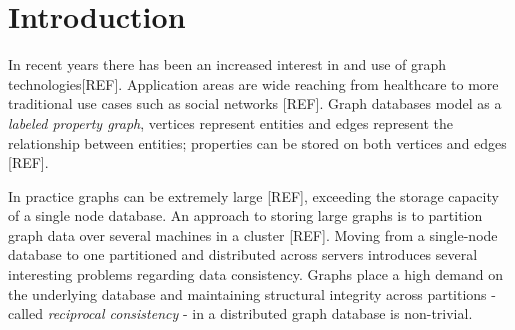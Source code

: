 \documentclass[sigplan,screen]{acmart}
\begin{document}





\maketitle

\section{Introduction}
In recent years there has been an increased interest in and use of graph technologies[REF]. Application areas are wide reaching from healthcare to more traditional use cases such as social networks [REF]. Graph databases model as a \textit{labeled property graph}, vertices represent entities and edges represent the relationship between entities; properties can be stored on both vertices and edges [REF].

In practice graphs can be extremely large [REF], exceeding the storage capacity of a single node database. An approach to storing large graphs is to partition graph data over several machines in a cluster [REF]. Moving from a single-node database to one partitioned and distributed across servers introduces several interesting problems regarding data consistency. Graphs place a high demand on the underlying database and maintaining structural integrity across partitions - called \textit{reciprocal consistency} - in a distributed graph database is non-trivial.
\end{document}
